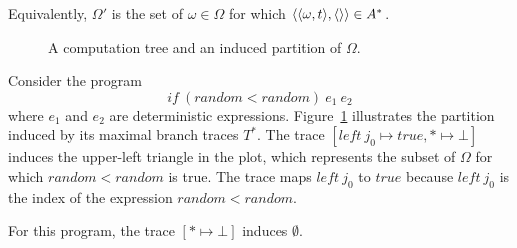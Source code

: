 Equivalently, $\Omega'$ is the set of $\omega \in \Omega$ for which $\langle{\langle{\omega,t}\rangle,\langle{}\rangle}\rangle \in A^*$.

\begin{figure}[tb!]\centering
{}%
\tab\tab%
%
\caption[A computation tree and an induced partition of $\Omega$]{A computation tree and an induced partition of $\Omega$.}
\label{fig:trace-induced-partition}
\end{figure}


\begin{example}
Consider the program
\begin{equation}
	if~(random < random)~\mathit{e_1}~\mathit{e_2}
\end{equation}
where $\mathit{e_1}$ and $\mathit{e_2}$ are deterministic expressions.
Figure~\ref{fig:trace-induced-partition} illustrates the partition induced by its maximal branch traces $T^*$.
The trace $[left~j_0 \mapsto true, * \mapsto \bot]$ induces the upper-left triangle in the plot, which represents the subset of $\Omega$ for which $random < random$ is true.
The trace maps $left~j_0$ to $true$ because $left~j_0$ is the index of the expression $random < random$.

For this program, the trace $[* \mapsto \bot]$ induces $\emptyset$.
\exampleqed
\end{example}

